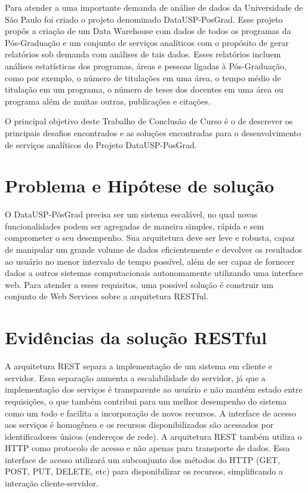 \par
Para atender a uma importante demanda de análise de dados da Universidade de São Paulo foi criado o projeto denominado DataUSP-PosGrad. Esse projeto propôs a criação de um Data Warehouse com dados de todos os programas da Pós-Graduação e um conjunto de serviços analíticos com o propósito de gerar relatórios sob demanda com análises de tais dados. Esses relatórios incluem análises estatísticas dos programas, áreas e pessoas ligadas à Pós-Graduação, como por exemplo, o número de titulações em uma área, o tempo médio de titulação em um programa, o número de teses dos docentes em uma área ou programa além de muitas outras, publicações e citações.

\par
O principal objetivo deste Trabalho de Conclusão de Curso é o de descrever os principais desafios encontrados e as soluções encontradas para o desenvolvimento de serviços analíticos do Projeto DataUSP-PosGrad.

\section{Problema e Hipótese de solução}


O DataUSP-PósGrad precisa ser um sistema escalável, no qual novas funcionalidades podem ser agregadas de maneira simples,
rápida e sem comprometer o seu desempenho. Sua arquitetura deve ser leve e robusta, capaz de manipular um grande volume de dados eficientemente e devolver os resultados ao usuário no menor intervalo de tempo possível, além de ser capaz de fornecer dados a outros sistemas computacionais autonomamente utilizando uma interface web. Para atender a esses requisitos, uma possível solução é construir um conjunto de Web Services sobre a arquitetura RESTful.

\section{Evidências da solução RESTful}

A arquitetura REST separa a implementação de um sistema em cliente e servidor. Essa separação aumenta a escalabilidade do servidor, já que a implementação dos serviços é transparente ao usuário e não mantém estado entre requisições, o que também contribui para um melhor desempenho do sistema como um todo e facilita a incorporação de novos recursos. A interface de acesso aos serviços é homogênea e os recursos disponibilizados são acessados por identificadores únicos (endereços de rede). A arquitetura REST também utiliza o HTTP como protocolo de acesso e não apenas para transporte de dados. Essa interface de acesso utilizará um subconjunto dos métodos do HTTP (GET, POST, PUT, DELETE, etc) para disponibilizar os recursos, simplificando a interação cliente-servidor.

